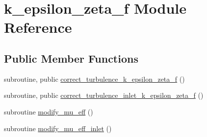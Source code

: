 \hypertarget{classk__epsilon__zeta__f}{\section{k\-\_\-epsilon\-\_\-zeta\-\_\-f Module Reference}
\label{classk__epsilon__zeta__f}
}
\subsection*{Public Member Functions}
\begin{DoxyCompactItemize}
\item 
subroutine, public \hyperlink{classk__epsilon__zeta__f_a96d9ff45439b59d5b8335e39aad4d47d}{correct\-\_\-turbulence\-\_\-k\-\_\-epsilon\-\_\-zeta\-\_\-f} ()
\item 
subroutine, public \hyperlink{classk__epsilon__zeta__f_a7e80d54ab71f25e4596d0ca6a46ee4ba}{correct\-\_\-turbulence\-\_\-inlet\-\_\-k\-\_\-epsilon\-\_\-zeta\-\_\-f} ()
\item 
subroutine \hyperlink{classk__epsilon__zeta__f_aee004b7784046d5d09ef6090646cd0de}{modify\-\_\-mu\-\_\-eff} ()
\item 
subroutine \hyperlink{classk__epsilon__zeta__f_a2c14f0a38ce6658faca9884c37c791b4}{modify\-\_\-mu\-\_\-eff\-\_\-inlet} ()
\end{DoxyCompactItemize}
